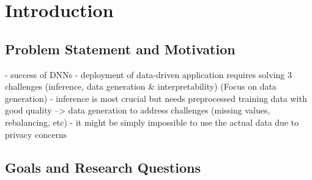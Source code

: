 \chapter{Introduction}
\label{ch:introduction}

\section{Problem Statement and Motivation} 
\label{ch:intro-problemStatement}

- success of DNNs \cite{borisov2022DeepNeuralNetworks}
- deployment of data-driven application requires solving 3 challenges (inference, data generation & interpretability) \cite{borisov2022DeepNeuralNetworks} (Focus on data generation)
- inference is most crucial but needs preprocessed training data with good quality --> data generation to address challenges (missing values, rebalancing, etc) \cite{borisov2022DeepNeuralNetworks}
- it might be simply impossible to use the actual data due to privacy concerns \cite{borisov2022DeepNeuralNetworks}




\section{Goals and Research Questions}
\label{ch:intro-goals}



